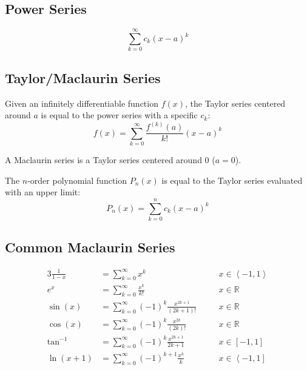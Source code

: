\documentclass[12pt]{article}
\newcommand*{\R}{\mathbb{R}}
\newcommand*{\rmaskip}{\setlength{\abovedisplayskip}{0pt}}
\newcommand*{\rmbskip}{\setlength{\belowdisplayskip}{0pt}}
\newcommand*{\rmskip}{\rmaskip \rmbskip}
\newcommand*{\isum}[1][k]{\sum_{#1=0}^\infty}
\begin{document}
\subsection*{Power Series}
\[
  \isum c_k{(x-a)}^k
\]
\subsection*{Taylor/Maclaurin Series}
Given an infinitely differentiable function \(f(x)\), the Taylor series
centered around \(a\) is equal to the power series with a specific \(c_k\):
\[
  f(x) = \isum \frac{f^{(k)}(a)}{k!}{(x-a)}^k
\]

A Maclaurin series is a Taylor series centered around 0 (\(a = 0\)).

The \(n\)-order polynomial function \(P_n(x)\) is equal to
the Taylor series evaluated with an upper limit:
\[
  P_n(x) = \sum_{k=0}^{n} c_k{(x - a)}^k
\]
\subsection*{Common Maclaurin Series}
{\rmskip\begin{alignat*}{3}
  \frac{1}{1-x} &= \isum x^k &&\quad x \in \left<-1,1\right>\\
  e^x &= \isum \frac{x^k}{k!} &&\quad x \in \R\\
  \sin(x) &= \isum {(-1)}^k \frac{x^{2k+1}}{(2k+1)!} &&\quad x \in \R\\
  \cos(x) &= \isum {(-1)}^k \frac{x^{2k}}{(2k)!} &&\quad x \in \R\\
  \tan^{-1} &= \isum {(-1)}^k \frac{x^{2k+1}}{2k+1} &&\quad x \in [-1,1]\\
  \ln(x+1) &= \isum {(-1)}^{k+1} \frac{x^k}{k} &&\quad x \in
    \left<-1,1\right]
\end{alignat*}}%
\end{document}
